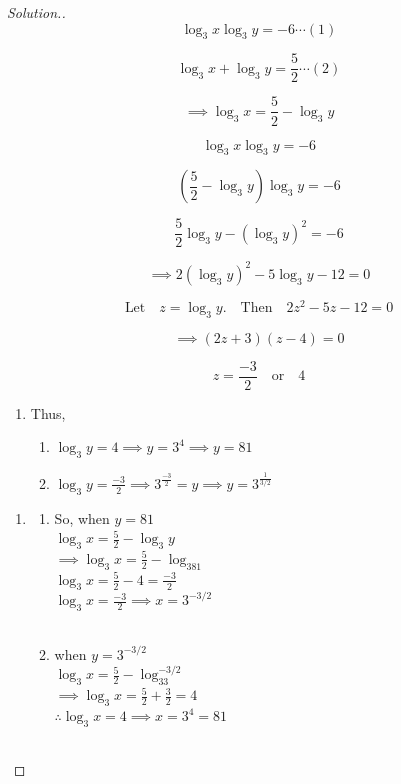 \documentclass[11pt,a4paper]{article}
\theoremstyle{definition}
\newenvironment{solution}
  {\renewcommand{\qedsymbol}{}\begin{proof}[\textit{Solution}.]}
  {\end{proof}}
\begin{document}
\begin{solution}

$$\log_3x\log_3y=-6\cdots (1)$$

$$\log_3x+\log_3y=\frac{5}{2}\cdots (2)$$

$$\implies \log_3x=\frac{5}{2}-\log_3y$$

$$\log_3x\log_3y=-6$$

$$\left(\frac{5}{2}-\log_3y\right)\log_3y=-6$$

$$\frac{5}{2}\log_3y-(\log_3y)^2=-6$$

$$\implies 2(\log_3y)^2-5\log_3y-12=0$$

$$\text{Let}\quad  z=\log_3y.\quad  \text{Then}\quad  2z^2-5z-12=0$$

$$\implies (2z+3)(z-4)=0$$

$$z=\frac{-3}{2}\quad \text{or}\quad 4$$

\begin{enumerate}
\item[] Thus,
\begin{enumerate}
      \item[] $\log_3y=4\implies y=3^4\implies y=81$
      
      \item[] $\log_3y=\frac{-3}{2}\implies 3^{\frac{-3}{2}}=y\implies y=3^{\frac{1}{3/2}}$\\
\end{enumerate}
\end{enumerate}





\begin{enumerate}
\item[]
\begin{enumerate}
      \item[] So, when $y=81$\\
      
      $\log_3x=\frac{5}{2}-\log_3y$\\
      
      $\implies \log_3x=\frac{5}{2}-\log_381$\\
      
      $\log_3x = \frac{5}{2}-4=\frac{-3}{2}$\\
      
      $\log_3x=\frac{-3}{2}\implies x=3^{-3/2}$\\\\
      
      
      \item when $y=3^{-3/2}$\\
      
      $\log_3x=\frac{5}{2}-\log_33^{-3/2}$\\
      
      $\implies \log_3x=\frac{5}{2}+\frac{3}{2}=4$\\
      
      $\therefore \log_3x=4\implies x=3^4=81$\\\\
\end{enumerate}
\end{enumerate}
\end{solution}
\pagebreak
\end{document}
